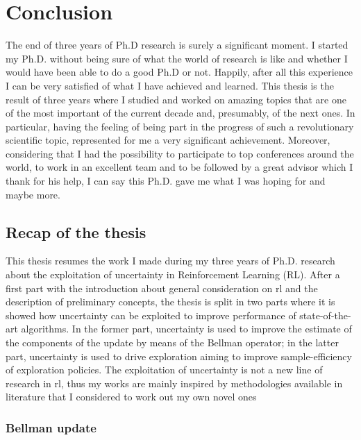 \chapter{Conclusion}
The end of three years of Ph.D research is surely a significant moment. I started my Ph.D. without being sure of what the world of research is like and whether I would have been able to do a good Ph.D or not. Happily, after all this experience I can be very satisfied of what I have achieved and learned.
This thesis is the result of three years where I studied and worked on amazing topics that are one of the most important of the current decade and, presumably, of the next ones. In particular, having the feeling of being part in the progress of such a revolutionary scientific topic, represented for me a very significant achievement. Moreover, considering that I had the possibility to participate to top conferences around the world, to work in an excellent team and to be followed by a great advisor which I thank for his help, I can say this Ph.D. gave me what I was hoping for and maybe more.

\section{Recap of the thesis}
This thesis resumes the work I made during my three years of Ph.D. research about the exploitation of uncertainty in Reinforcement Learning (RL). After a first part with the introduction about general consideration on \gls{rl} and the description of preliminary concepts, the thesis is split in two parts where it is showed how uncertainty can be exploited to improve performance of state-of-the-art algorithms. In the former part, uncertainty is used to improve the estimate of the components of the update by means of the Bellman operator; in the latter part, uncertainty is used to drive exploration aiming to improve sample-efficiency of exploration policies. The exploitation of uncertainty is not a new line of research in \gls{rl}, thus my works are mainly inspired by methodologies available in literature that I considered to work out my own novel ones

\subsection{Bellman update}
